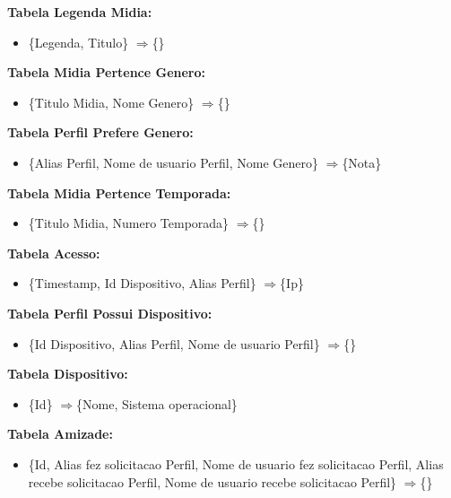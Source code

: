 \documentclass[12pt,a4paper]{article}
\newcommand{\rarrow}{$\Longrightarrow$}
\begin{document}
    {\bf Tabela Legenda Midia: }
    \begin{itemize}
        \item \{Legenda, Titulo\} \rarrow \{\} \\
    \end{itemize}
    
    {\bf Tabela Midia Pertence Genero: }
    \begin{itemize}
        \item \{Titulo Midia, Nome Genero\} \rarrow \{\} \\
    \end{itemize}
    
    {\bf Tabela Perfil Prefere Genero: }
    \begin{itemize}
        \item \{Alias Perfil, Nome de usuario Perfil, Nome Genero\} \rarrow \{Nota\} \\
    \end{itemize}
    
    {\bf Tabela Midia Pertence Temporada: }
    \begin{itemize}
        \item \{Titulo Midia, Numero Temporada\} \rarrow \{\} \\
    \end{itemize}
    
    {\bf Tabela Acesso: }
    \begin{itemize}
        \item \{Timestamp, Id Dispositivo, Alias Perfil\} \rarrow \{Ip\} \\
    \end{itemize}
    
    {\bf Tabela Perfil Possui Dispositivo: }
    \begin{itemize}
        \item \{Id Dispositivo, Alias Perfil, Nome de usuario Perfil\} \rarrow \{\} \\
    \end{itemize}
    
    {\bf Tabela Dispositivo: }
    \begin{itemize}
        \item \{Id\} \rarrow \{Nome, Sistema operacional\} \\
    \end{itemize}
    
    {\bf Tabela Amizade: }
    \begin{itemize}
        \item \{Id, Alias fez solicitacao Perfil, Nome de usuario fez solicitacao Perfil, Alias recebe solicitacao Perfil, Nome de usuario recebe solicitacao Perfil\} \rarrow \{\} \\
    \end{itemize}
    
\end{document}
